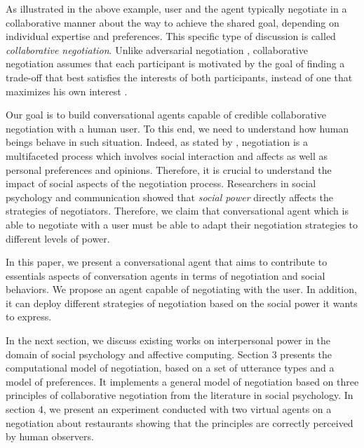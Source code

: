 \documentclass{llncs}
\begin{document}
	As illustrated in the above example, user and the agent typically negotiate in a collaborative manner about the way to achieve the shared goal, depending on individual expertise and preferences. This specific type of discussion is called \emph{collaborative negotiation}. Unlike adversarial negotiation \cite{broekens2010affective}, collaborative negotiation assumes that each participant is motivated by the goal of finding a trade-off that best satisfies the interests of both participants, instead of one that maximizes his own interest \cite{sidner1994artificial,chu1995response}.
	
	Our goal is to build conversational agents capable of credible collaborative negotiation with a human user. To this end, we need to understand how human beings behave in such situation. Indeed, as stated by \cite{broekens2010affective}, negotiation is a multifaceted process which involves social interaction and affects as well as personal preferences and opinions. Therefore, it is crucial to understand the impact of social aspects of the negotiation process. Researchers in social psychology and communication \cite{dunbar2005perceptions,de1995impact} showed that \emph{social power} directly  affects the strategies of negotiators. Therefore, we claim that conversational agent which is able to negotiate with a user must be able to adapt their negotiation strategies to different levels of power.
	
	In this paper, we present a conversational agent that aims to contribute to essentials aspects of conversation agents in terms of negotiation and social behaviors. We propose an agent capable of negotiating with the user. In addition, it can deploy different strategies of negotiation based on the social power it wants to express.
	
	In the next section, we discuss existing works on interpersonal power in the domain of social psychology and affective computing. Section 3 presents the computational model of negotiation, based on a set of utterance types and a model of preferences. It implements a general model of negotiation based on three principles of collaborative negotiation from the literature in social psychology. In section 4, we present an experiment conducted with two virtual agents on a negotiation about restaurants showing that the principles are correctly perceived by human observers.	
	
\end{document}
